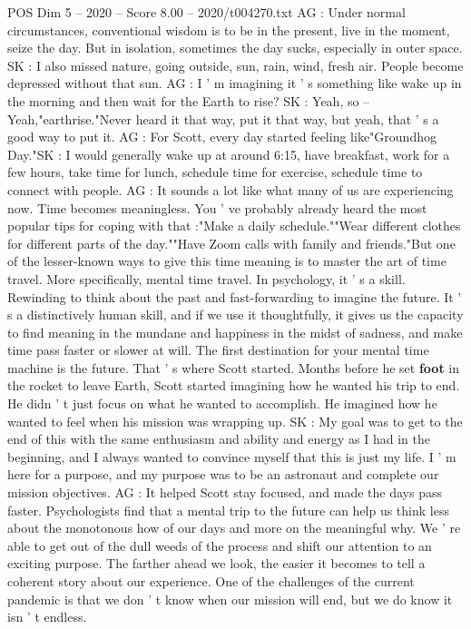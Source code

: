 \begin{textsample}{POS Dim 5 – 2020 – Score 8.00 – 2020/t004270.txt}
AG : Under normal circumstances, conventional wisdom is to be in the present, live in the moment, seize the day.
But in isolation, sometimes the day sucks, especially in outer space.
SK : I also missed nature, going outside, sun, rain, wind, fresh air.
People become depressed without that sun.
AG : I ' m imagining it ' s something like wake up in the morning and then wait for the Earth to rise?
SK : Yeah, so -- Yeah,"earthrise."Never heard it that way, put it that way, but yeah, that ' s a good way to put it.
AG : For Scott, every day started feeling like"Groundhog Day."SK : I would generally wake up at around 6:15, have breakfast, work for a few hours, take time for lunch, schedule time for exercise, schedule time to connect with people.
AG : It sounds a lot like what many of us are experiencing now.
Time becomes meaningless.
You ' ve probably already heard the most popular tips for coping with that :"Make a daily schedule.""Wear different clothes for different parts of the day.""Have Zoom calls with family and friends."But one of the lesser-known ways to give this time meaning is to master the art of time travel.
More specifically, mental time travel.
In psychology, it ' s a skill.
Rewinding to think about the past and fast-forwarding to imagine the future.
It ' s a distinctively human skill, and if we use it thoughtfully, it gives us the capacity to find meaning in the mundane and happiness in the midst of sadness, and make time pass faster or slower at will.
The first destination for your mental time machine is the future.
That ' s where Scott started.
Months before he set \textbf{foot} in the rocket to leave Earth, Scott started imagining how he wanted his trip to end.
He didn ' t just focus on what he wanted to accomplish.
He imagined how he wanted to feel when his mission was wrapping up.
SK : My goal was to get to the end of this with the same enthusiasm and ability and energy as I had in the beginning, and I always wanted to convince myself that this is just my life.
I ' m here for a purpose, and my purpose was to be an astronaut and complete our mission objectives.
AG : It helped Scott stay focused, and made the days pass faster.
Psychologists find that a mental trip to the future can help us think less about the monotonous how of our days and more on the meaningful why.
We ' re able to get out of the dull weeds of the process and shift our attention to an exciting purpose.
The farther ahead we look, the easier it becomes to tell a coherent story about our experience.
One of the challenges of the current pandemic is that we don ' t know when our mission will end, but we do know it isn ' t endless.

\end{textsample}
